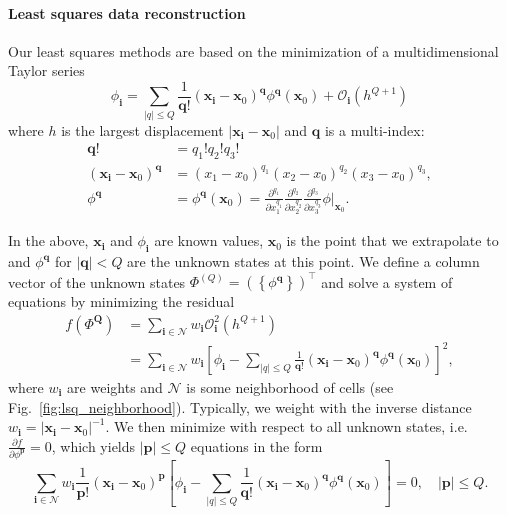 \documentclass[3p]{elsarticle}
\begin{document}
\paragraph{Least squares data reconstruction}

Our least squares methods are based on the minimization of a multidimensional Taylor series
\begin{equation}
  \phi_{\bm{i}} = \sum_{|q|\leq Q}\frac{1}{\bm{q}!}\left(\bm{x}_{\bm{i}} - \bm{x}_0\right)^{\bm{q}}\phi^{\bm{q}}(\bm{x}_0) + \mathcal{O}_{\bm{i}}\left(h^{Q+1}\right)
\end{equation}
where $h$ is the largest displacement $\left|\bm{x}_{\bm{i}} - \bm{x}_0\right|$ and $\bm{q}$ is a multi-index:
\begin{subequations}
  \begin{align}
    \bm{q}! &= q_1!q_2!q_3! \\
    \left(\bm{x}_{\bm{i}} - \bm{x}_0\right)^{\bm{q}} &= \left(x_1 - x_0\right)^{q_1}\left(x_2 - x_0\right)^{q_2}\left(x_3 - x_0\right)^{q_3}, \\
    \phi^{\bm{q}} &= \phi^{\bm{q}}(\bm{x}_0) = \frac{\partial^{q_1}}{\partial x_1^{q_1}}\frac{\partial^{q_2}}{\partial x_2^{q_2}}\frac{\partial^{q_3}}{\partial x_3^{q_3}}\phi\big|_{\bm{x}_0}.
  \end{align}
\end{subequations}

In the above, $\bm{x}_{\bm{i}}$ and $\phi_{\bm{i}}$ are known values, $\bm{x}_0$ is the point that we extrapolate to and $\phi^{\bm{q}}$ for $|\bm{q}| < Q$ are the unknown states at this point. We define a column vector of the unknown states $\Phi^{(Q)} = \left(\left\{\phi^{\bm{q}}\right\}\right)^\intercal$ and solve a system of equations by minimizing the residual
\begin{equation}
  \begin{split}
    f\left(\Phi^{\bm{Q}}\right) &= \sum_{\bm{i} \in \mathcal{N}}w_{\bm{i}}\mathcal{O}_{\bm{i}}^2\left(h^{Q+1}\right) \\
    &= \sum_{\bm{i} \in \mathcal{N}}w_{\bm{i}}\left[\phi_{\bm{i}} - \sum_{|q|\leq Q}\frac{1}{\bm{q}!}\left(\bm{x}_{\bm{i}} - \bm{x}_0\right)^{\bm{q}}\phi^{\bm{q}}(\bm{x}_0)\right]^2,
  \end{split}
\end{equation}
where $w_{\bm{i}}$ are weights and $\mathcal{N}$ is some neighborhood of cells (see Fig.~\ref{fig:lsq_neighborhood}). Typically, we weight with the inverse distance $w_{\bm{i}} = \left|\bm{x}_{\bm{i}} - \bm{x}_0\right|^{-1}$. We then minimize with respect to all unknown states, i.e. $\frac{\partial f}{\partial \phi^{\bm{p}}} = 0$, which yields $|\bm{p}| \leq Q$ equations in the form
\begin{equation}
  \sum_{\bm{i} \in \mathcal{N}}w_{\bm{i}}\frac{1}{\bm{p}!}\left(\bm{x}_{\bm{i}} - \bm{x}_0\right)^{\bm{p}}\left[\phi_{\bm{i}} - \sum_{|q|\leq Q}\frac{1}{\bm{q}!}\left(\bm{x}_{\bm{i}} - \bm{x}_0\right)^{\bm{q}}\phi^{\bm{q}}(\bm{x}_0)\right] = 0, \quad |\bm{p}| \leq Q.
\end{equation}
\end{document}
